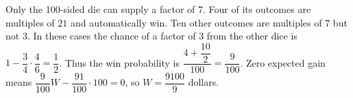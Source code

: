 Only the 100-sided die can supply a factor of $7$. Four of its outcomes are multiples of $21$ and automatically win. Ten other outcomes are multiples of $7$ but not $3$. In these cases the chance of a factor of $3$ from the other dice is $1-\dfrac{3}{4}\cdot\dfrac{4}{6}=\dfrac{1}{2}$. Thus the win probability is $\dfrac{4+\dfrac{10}{2}}{100}=\dfrac{9}{100}$. Zero expected gain means $\dfrac{9}{100}W-\dfrac{91}{100}\cdot100=0$, so $\boxed{W=\dfrac{9100}{9}}$ dollars.
